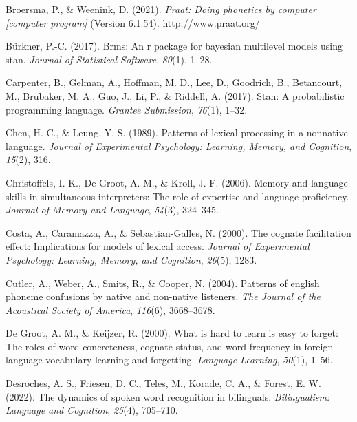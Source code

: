 \documentclass[
]{article}
\newlength{\cslhangindent}
\newenvironment{CSLReferences}[2] %
 {\begin{list}{}{%
  \setlength{\itemindent}{0pt}
  \setlength{\leftmargin}{0pt}
  \setlength{\parsep}{0pt}
  \ifodd #1
   \setlength{\leftmargin}{\cslhangindent}
   \setlength{\itemindent}{-1\cslhangindent}
  \fi
  \setlength{\itemsep}{#2\baselineskip}}}
 {\end{list}}
\begin{document}
\begin{CSLReferences}{1}{0}
Broersma, P., \& Weenink, D. (2021). \emph{Praat: Doing phonetics by
computer {[}computer program{]}} (Version 6.1.54).
\url{http://www.praat.org/}

Bürkner, P.-C. (2017). Brms: An r package for bayesian multilevel models
using stan. \emph{Journal of Statistical Software}, \emph{80}(1), 1--28.

Carpenter, B., Gelman, A., Hoffman, M. D., Lee, D., Goodrich, B.,
Betancourt, M., Brubaker, M. A., Guo, J., Li, P., \& Riddell, A. (2017).
Stan: A probabilistic programming language. \emph{Grantee Submission},
\emph{76}(1), 1--32.

Chen, H.-C., \& Leung, Y.-S. (1989). Patterns of lexical processing in a
nonnative language. \emph{Journal of Experimental Psychology: Learning,
Memory, and Cognition}, \emph{15}(2), 316.

Christoffels, I. K., De Groot, A. M., \& Kroll, J. F. (2006). Memory and
language skills in simultaneous interpreters: The role of expertise and
language proficiency. \emph{Journal of Memory and Language},
\emph{54}(3), 324--345.

Costa, A., Caramazza, A., \& Sebastian-Galles, N. (2000). The cognate
facilitation effect: Implications for models of lexical access.
\emph{Journal of Experimental Psychology: Learning, Memory, and
Cognition}, \emph{26}(5), 1283.

Cutler, A., Weber, A., Smits, R., \& Cooper, N. (2004). Patterns of
english phoneme confusions by native and non-native listeners. \emph{The
Journal of the Acoustical Society of America}, \emph{116}(6),
3668--3678.

De Groot, A. M., \& Keijzer, R. (2000). What is hard to learn is easy to
forget: The roles of word concreteness, cognate status, and word
frequency in foreign-language vocabulary learning and forgetting.
\emph{Language Learning}, \emph{50}(1), 1--56.

Desroches, A. S., Friesen, D. C., Teles, M., Korade, C. A., \& Forest,
E. W. (2022). The dynamics of spoken word recognition in bilinguals.
\emph{Bilingualism: Language and Cognition}, \emph{25}(4), 705--710.


\end{CSLReferences}
\end{document}
